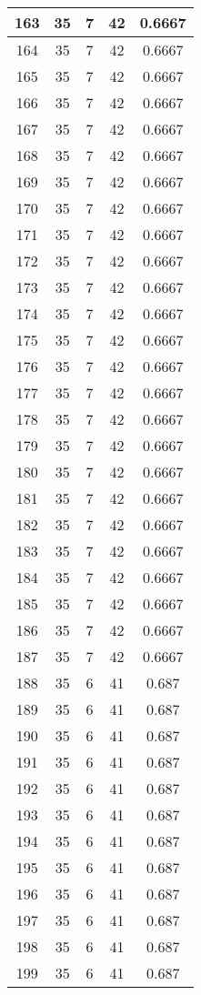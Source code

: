 \documentclass[letterpaper, 12pt]{article}
\begin{document}
\begin{longtable}{|c|c|c|c|c|}
\hline
163 & 35 & 7 & 42 & 0.6667 \\
\hline
164 & 35 & 7 & 42 & 0.6667 \\
\hline
165 & 35 & 7 & 42 & 0.6667 \\
\hline
166 & 35 & 7 & 42 & 0.6667 \\
\hline
167 & 35 & 7 & 42 & 0.6667 \\
\hline
168 & 35 & 7 & 42 & 0.6667 \\
\hline
169 & 35 & 7 & 42 & 0.6667 \\
\hline
170 & 35 & 7 & 42 & 0.6667 \\
\hline
171 & 35 & 7 & 42 & 0.6667 \\
\hline
172 & 35 & 7 & 42 & 0.6667 \\
\hline
173 & 35 & 7 & 42 & 0.6667 \\
\hline
174 & 35 & 7 & 42 & 0.6667 \\
\hline
175 & 35 & 7 & 42 & 0.6667 \\
\hline
176 & 35 & 7 & 42 & 0.6667 \\
\hline
177 & 35 & 7 & 42 & 0.6667 \\
\hline
178 & 35 & 7 & 42 & 0.6667 \\
\hline
179 & 35 & 7 & 42 & 0.6667 \\
\hline
180 & 35 & 7 & 42 & 0.6667 \\
\hline
181 & 35 & 7 & 42 & 0.6667 \\
\hline
182 & 35 & 7 & 42 & 0.6667 \\
\hline
183 & 35 & 7 & 42 & 0.6667 \\
\hline
184 & 35 & 7 & 42 & 0.6667 \\
\hline
185 & 35 & 7 & 42 & 0.6667 \\
\hline
186 & 35 & 7 & 42 & 0.6667 \\
\hline
187 & 35 & 7 & 42 & 0.6667 \\
\hline
188 & 35 & 6 & 41 & 0.687 \\
\hline
189 & 35 & 6 & 41 & 0.687 \\
\hline
190 & 35 & 6 & 41 & 0.687 \\
\hline
191 & 35 & 6 & 41 & 0.687 \\
\hline
192 & 35 & 6 & 41 & 0.687 \\
\hline
193 & 35 & 6 & 41 & 0.687 \\
\hline
194 & 35 & 6 & 41 & 0.687 \\
\hline
195 & 35 & 6 & 41 & 0.687 \\
\hline
196 & 35 & 6 & 41 & 0.687 \\
\hline
197 & 35 & 6 & 41 & 0.687 \\
\hline
198 & 35 & 6 & 41 & 0.687 \\
\hline
199 & 35 & 6 & 41 & 0.687 \\
\hline
\end{longtable}
\end{document}
